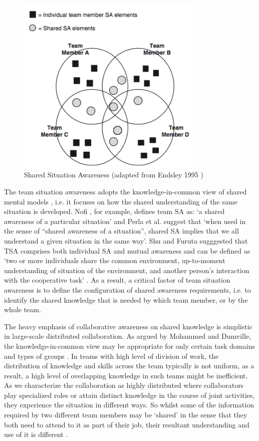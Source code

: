 \begin{figure}[htbp] %
   \centering
   \includegraphics[width=3.5in]{TSA.jpg} 
   \caption{Shared Situation Awareness (adapted from Endsley 1995 \cite{Endsley1995})}
   \label{fig:tsa}
\end{figure}

The team situation awareness adopts the knowledge-in-common view of shared mental models \cite{Mohammed2001}, i.e. it focuses on how the shared understanding of the same situation is developed. Nofi \cite{nofi2000defining}, for example, defines team SA as: `a shared awareness of a particular situation' and Perla et al. \cite{perla2000gaming} suggest that `when used in the sense of ``shared awareness of a situation'', shared SA implies that we all understand a given situation in the same way'. Shu and Furuta sugggested that TSA comprises both individual SA and mutual awareness and can be defined as `two or more individuals share the common environment, up-to-moment understanding of situation of the environment, and another person's interaction with the cooperative task' \cite{shu2005inference}. As a result, a critical factor of team situation awareness is to define the configuration of shared awareness requirements, i.e. to identify the shared knowledge that is needed by which team member, or by the whole team.

The heavy emphasis of collaborative awareness on shared knowledge is simplistic in large-scale distributed collaboration. As argued by Mohammed and Dumville, the knowledge-in-common view may be appropriate for only certain task domains and types of groups \cite{Mohammed2001}. In teams with high level of division of work, the distribution of knowledge and skills across the team typically is not uniform, as a result, a high level of overlapping knowledge in such teams might be inefficient. As we characterize the collaboration as highly distributed where collaborators play specialized roles or attain distinct knowledge in the course of joint activities, they experience the situation in different ways. So whilst some of the information required by two different team members may be `shared' in the sense that they both need to attend to it as part of their job, their resultant understanding and use of it is different \cite{Salmon2010}.

